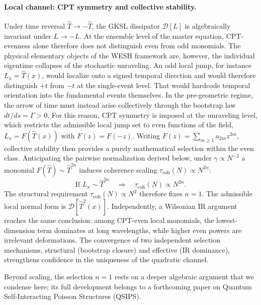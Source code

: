 \documentclass[12pt,a4paper]{article}
\numberwithin{equation}{section}
\begin{document}
\paragraph{Local channel: CPT symmetry and collective stability.}
Under time reversal $\hat T \to -\hat T$, the GKSL dissipator
$\mathcal{D}[L]$ is algebraically invariant under $L \to -L$. At the
ensemble level of the master equation, CPT-evenness alone therefore does
not distinguish even from odd monomials. The physical elementary objects
of the WESH framework are, however, the individual eigentime collapses of
the stochastic unraveling. An odd local jump, for instance
$L_x = \hat T(x)$, would localize onto a signed temporal direction and
would therefore distinguish $+t$ from $-t$ at the single-event level.
That would hardcode temporal orientation into the fundamental events
themselves. In the pre-geometric regime, the arrow of time must instead
arise collectively through the bootstrap law $dt/ds = \Gamma > 0$. For
this reason, CPT symmetry is imposed at the unraveling level, which
restricts the admissible local jump set to even functions of the field,
$L_x = F(\hat T(x))$ with $F(z)=F(-z)$. Writing
$F(z) = \sum_{m \ge 1} a_{2m} z^{2m}$, collective stability then provides
a purely mathematical selection within the even class. Anticipating the pairwise normalization derived below, under $\gamma \propto N^{-2}$ a monomial $F(\hat T) \sim \hat T^{2n}$ induces coherence scaling $\tau_{\mathrm{coh}}(N) \propto N^{2n}$:
\begin{equation}
\text{If } L_x \sim \hat{T}^{2n} \quad\Rightarrow\quad
\tau_{\mathrm{coh}}(N)\propto N^{2n}.
\label{eq:scaling-condition}
\end{equation}
The structural requirement $\tau_{\mathrm{coh}}(N) \propto N^2$ therefore fixes $n = 1$. The admissible local normal form is $\mathcal{D}[\hat T^2(x)]$. Independently, a Wilsonian IR argument reaches the same conclusion: among CPT-even local monomials, the lowest-dimension term dominates at long wavelengths, while higher even powers are irrelevant deformations. The convergence of two independent selection mechanisms, structural (bootstrap closure) and effective (IR dominance), strengthens confidence in the uniqueness of the quadratic channel.

Beyond scaling, the selection $n = 1$ rests on a deeper algebraic argument that we condense here; its full development belongs to a forthcoming paper on Quantum Self-Interacting Poisson Structures (QSIPS).
\end{document}
